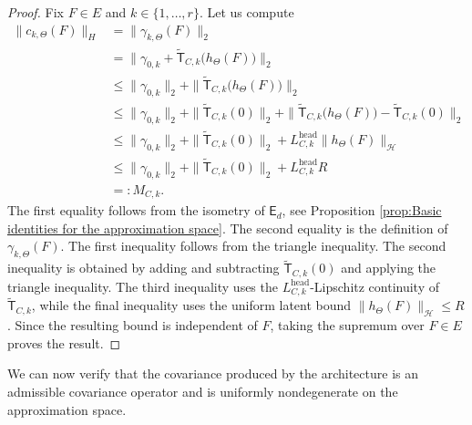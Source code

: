 \begin{proof}
Fix \(F\in E\) and \(k\in\{1,\ldots,r\}\). Let us compute
\[
\begin{aligned}
\|c_{k,\Theta}(F)\|_H
&=
\|\gamma_{k,\Theta}(F)\|_2\\
&=
\|
\gamma_{0,k}
+
\widetilde{\mathsf T}_{C,k}
\bigl(h_\Theta(F)\bigr)
\|_2\\
&\leqslant
\|\gamma_{0,k}\|_2
+
\|
\widetilde{\mathsf T}_{C,k}
\bigl(h_\Theta(F)\bigr)
\|_2\\
&\leqslant
\|\gamma_{0,k}\|_2
+
\|\widetilde{\mathsf T}_{C,k}(0)\|_2
+
\|
\widetilde{\mathsf T}_{C,k}
\bigl(h_\Theta(F)\bigr)
-
\widetilde{\mathsf T}_{C,k}(0)
\|_2
\\
&\leqslant
\|\gamma_{0,k}\|_2
+
\|\widetilde{\mathsf T}_{C,k}(0)\|_2
+
L_{C,k}^{\mathrm{head}}
\|h_\Theta(F)\|_{\mathcal H}
\\
&\leqslant
\|\gamma_{0,k}\|_2
+
\|\widetilde{\mathsf T}_{C,k}(0)\|_2
+
L_{C,k}^{\mathrm{head}}R
\\
&=:
M_{C,k}.
\end{aligned}
\]
The first equality follows from the isometry of \(\mathsf E_d\), see Proposition \ref{prop:Basic identities for the approximation space}. The second equality is the definition of \(\gamma_{k,\Theta}(F)\). The first inequality follows from the triangle inequality. The second inequality is obtained by adding and subtracting \(\widetilde{\mathsf T}_{C,k}(0)\) and applying the triangle inequality. The third inequality uses the \(L_{C,k}^{\mathrm{head}}\)-Lipschitz continuity of \(\widetilde{\mathsf T}_{C,k}\), while the final inequality uses the uniform latent bound \(\|h_\Theta(F)\|_{\mathcal H}\leqslant R\). Since the resulting bound is independent of \(F\), taking the supremum over \(F\in E\) proves the result.
\end{proof}

We can now verify that the covariance produced by the architecture is an admissible covariance operator and is uniformly nondegenerate on the approximation space.

